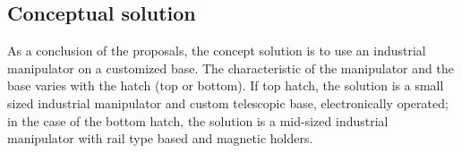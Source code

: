 \subsection{Conceptual solution}
As a conclusion of the proposals, the concept solution is to use an
industrial manipulator on a customized base. The characteristic of the
manipulator and the base varies with the hatch (top or bottom). If top hatch,
the solution is a small sized industrial manipulator and custom telescopic base, electronically
operated; in the case of the bottom hatch, the solution is a mid-sized industrial manipulator
with rail type based and magnetic holders.


